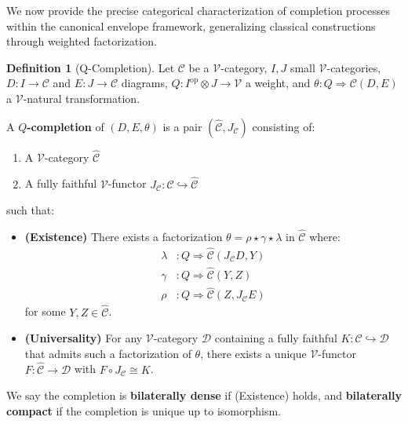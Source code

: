 \documentclass[11pt]{article}
\theoremstyle{plain}
\theoremstyle{definition}
\newtheorem{definition}[theorem]{Definition}
\theoremstyle{remark}
\newcommand{\V}{\mathcal{V}}
\newcommand{\op}{\mathrm{op}}
\begin{document}
We now provide the precise categorical characterization of completion processes within the canonical envelope framework, generalizing classical constructions through weighted factorization.

\begin{definition}[Q-Completion]
Let $\mathcal{C}$ be a $\V$-category, $I, J$ small $\V$-categories, $D : I \to \mathcal{C}$ and $E : J \to \mathcal{C}$ diagrams, $Q : I^{\op} \otimes J \to \V$ a weight, and $\theta : Q \Rightarrow \mathcal{C}(D,E)$ a $\V$-natural transformation.

A \textbf{$Q$-completion} of $(D, E, \theta)$ is a pair $(\widehat{\mathcal{C}}, J_{\mathcal{C}})$ consisting of:
\begin{enumerate}
\item A $\V$-category $\widehat{\mathcal{C}}$
\item A fully faithful $\V$-functor $J_{\mathcal{C}} : \mathcal{C} \hookrightarrow \widehat{\mathcal{C}}$
\end{enumerate}
such that:

\begin{itemize}
\item \textbf{(Existence)} There exists a factorization $\theta = \rho \star \gamma \star \lambda$ in $\widehat{\mathcal{C}}$ where:
\begin{align}
\lambda &: Q \Rightarrow \widehat{\mathcal{C}}(J_{\mathcal{C}} D, Y) \\
\gamma &: Q \Rightarrow \widehat{\mathcal{C}}(Y, Z) \\
\rho &: Q \Rightarrow \widehat{\mathcal{C}}(Z, J_{\mathcal{C}} E)
\end{align}
for some $Y, Z \in \widehat{\mathcal{C}}$.

\item \textbf{(Universality)} For any $\V$-category $\mathcal{D}$ containing a fully faithful $K : \mathcal{C} \hookrightarrow \mathcal{D}$ that admits such a factorization of $\theta$, there exists a unique $\V$-functor $F : \widehat{\mathcal{C}} \to \mathcal{D}$ with $F \circ J_{\mathcal{C}} \cong K$.
\end{itemize}

We say the completion is \textbf{bilaterally dense} if (Existence) holds, and \textbf{bilaterally compact} if the completion is unique up to isomorphism.
\end{definition}

\begin{center}
\end{center}
\end{document}
